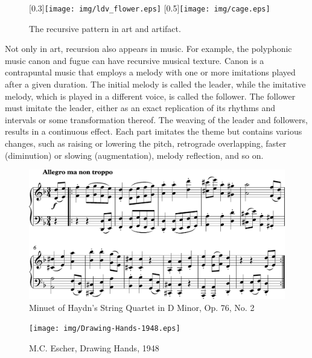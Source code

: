 \documentclass{article}
\begin{document}
\begin{figure}[htbp]
 \centering
 [0.3\linewidth]{\texttt{[image: img/ldv\_flower.eps]}} \quad
 [0.5\linewidth]{\texttt{[image: img/cage.eps]}}
 \caption{The recursive pattern in art and artifact.}
 \label{fig:flower}
\end{figure}

Not only in art, recursion also appears in music. For example, the polyphonic music canon and fugue can have recursive musical texture. Canon is a contrapuntal music that employs a melody with one or more imitations played after a given duration. The initial melody is called the leader, while the imitative melody, which is played in a different voice, is called the follower. The follower must imitate the leader, either as an exact replication of its rhythms and intervals or some transformation thereof. The weaving of the leader and followers, results in a continuous effect. Each part imitates the theme but contains various changes, such as raising or lowering the pitch, retrograde overlapping, faster (diminution) or slowing (augmentation), melody reflection, and so on.

\begin{figure}[htbp]
 \centering
 \includegraphics[scale=0.8]{img/Haydn-OP-76.png}
 \caption{Minuet of Haydn's String Quartet in D Minor, Op. 76, No. 2}
 \label{fig:Drawing-Hands}
\end{figure}

\begin{figure}[htbp]
 \centering
 \texttt{[image: img/Drawing-Hands-1948.eps]}
 \caption{M.C. Escher, Drawing Hands, 1948}
 \label{fig:Drawing-Hands}
\end{figure}
\end{document}

